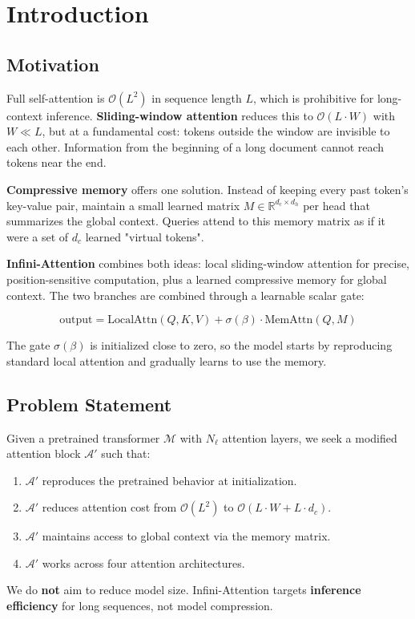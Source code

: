 
\section{Introduction}

\subsection{Motivation}

Full self-attention is $\mathcal{O}(L^2)$ in sequence length $L$, which is 
prohibitive for long-context inference. \textbf{Sliding-window attention} reduces 
this to $\mathcal{O}(L \cdot W)$ with $W \ll L$, but at a fundamental cost: 
tokens outside the window are invisible to each other. Information from the 
beginning of a long document cannot reach tokens near the end.

\textbf{Compressive memory} offers one solution. Instead of keeping every past 
token's key-value pair, maintain a small learned matrix $M \in \mathbb{R}^{d_c \times d_h}$ 
per head that summarizes the global context. Queries attend to this memory 
matrix as if it were a set of $d_c$ learned "virtual tokens".

\textbf{Infini-Attention} combines both ideas: local sliding-window attention for 
precise, position-sensitive computation, plus a learned compressive memory 
for global context. The two branches are combined through a learnable scalar 
gate:

\[
\text{output} = \text{LocalAttn}(Q, K, V) + \sigma(\beta) \cdot \text{MemAttn}(Q, M)
\tag{1.1}
\]

The gate $\sigma(\beta)$ is initialized close to zero, so the model starts by 
reproducing standard local attention and gradually learns to use the memory.

\subsection{Problem Statement}

Given a pretrained transformer $\mathcal{M}$ with $N_\ell$ attention layers, 
we seek a modified attention block $\mathcal{A}'$ such that:

\begin{enumerate}
\item $\mathcal{A}'$ reproduces the pretrained behavior at initialization.
\item $\mathcal{A}'$ reduces attention cost from $\mathcal{O}(L^2)$ to
  $\mathcal{O}(L \cdot W + L \cdot d_c)$.
\item $\mathcal{A}'$ maintains access to global context via the memory matrix.
\item $\mathcal{A}'$ works across four attention architectures.

\end{enumerate}
We do \textbf{not} aim to reduce model size. Infini-Attention targets 
\textbf{inference efficiency} for long sequences, not model compression.

